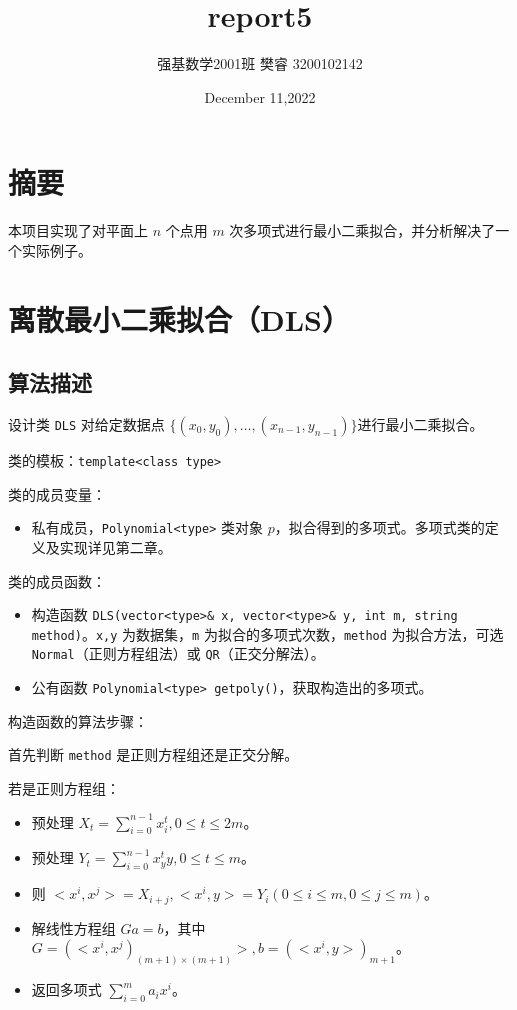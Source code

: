 \documentclass{ctexart}
\title{report5}
\author{强基数学2001班 樊睿 3200102142}
\date{December 11,2022}
\begin{document}
\maketitle

\section{摘要}
本项目实现了对平面上 $n$ 个点用 $m$ 次多项式进行最小二乘拟合，并分析解决了一个实际例子。

\section{离散最小二乘拟合（DLS）}

\subsection{算法描述}
设计类 \verb|DLS| 对给定数据点 $\{(x_0,y_0),\dots,(x_{n-1},y_{n-1})\}$进行最小二乘拟合。

类的模板：\verb|template<class type>|

类的成员变量：
\begin{itemize}
\item 私有成员，\verb|Polynomial<type>| 类对象 $p$，拟合得到的多项式。多项式类的定义及实现详见第二章。
\end{itemize}

类的成员函数：
\begin{itemize}
\item 构造函数 \verb|DLS(vector<type>& x, vector<type>& y, int m, string method)|。\verb|x,y| 为数据集，\verb|m| 为拟合的多项式次数，\verb|method| 为拟合方法，可选 \verb|Normal|（正则方程组法）或 \verb|QR|（正交分解法）。
\item 公有函数 \verb|Polynomial<type> getpoly()|，获取构造出的多项式。
\end{itemize}

构造函数的算法步骤：

首先判断 \verb|method| 是正则方程组还是正交分解。

若是正则方程组：
\begin{itemize}
\item 预处理 $X_t=\sum_{i=0}^{n-1}x_i^t,0\leq t\leq 2m$。
\item 预处理 $Y_t=\sum_{i=0}^{n-1}x_y^ty,0\leq t\leq m$。
\item 则 $<x^i,x^j>=X_{i+j},<x^i,y>=Y_i(0\leq i\leq m,0\leq j\leq m)$。
\item 解线性方程组 $Ga=b$，其中 $G=(<x^i,x^j)_{(m+1)\times (m+1)}>,b=(<x^i,y>)_{m+1}$。
\item 返回多项式 $\sum_{i=0}^ma_ix^i$。
\end{itemize}
\end{document}
